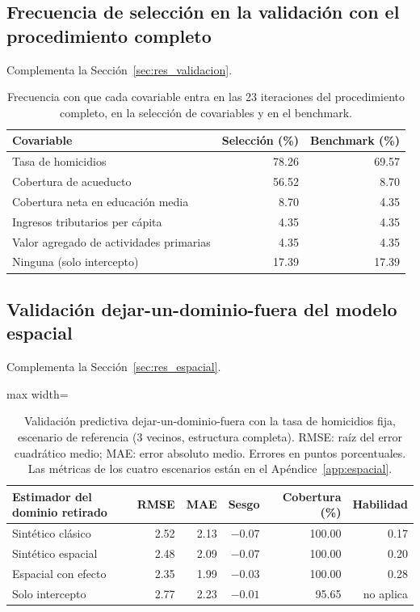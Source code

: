 \subsection{Frecuencia de selección en la validación con el procedimiento completo}

Complementa la Sección~\ref{sec:res_validacion}.

\begin{table}[!htbp]
\centering
\small
\caption{Frecuencia con que cada covariable entra en las 23 iteraciones del procedimiento completo, en la selección de covariables y en el benchmark.}
\label{tab:res_frecuencia}
\begin{tabular}{l r r}
\toprule
Covariable & Selección (\%) & Benchmark (\%) \\
\midrule
Tasa de homicidios & 78.26 & 69.57 \\
Cobertura de acueducto & 56.52 & 8.70 \\
Cobertura neta en educación media & 8.70 & 4.35 \\
Ingresos tributarios per cápita & 4.35 & 4.35 \\
Valor agregado de actividades primarias & 4.35 & 4.35 \\
Ninguna (solo intercepto) & 17.39 & 17.39 \\
\bottomrule
\end{tabular}
\end{table}

\subsection{Validación dejar-un-dominio-fuera del modelo espacial}

Complementa la Sección~\ref{sec:res_espacial}.

\begin{table}[!htbp]
\centering
\small
\caption[Validación del escenario espacial de referencia]{Validación predictiva dejar-un-dominio-fuera con la tasa de homicidios fija, escenario de referencia (3 vecinos, estructura completa). RMSE: raíz del error cuadrático medio; MAE: error absoluto medio. Errores en puntos porcentuales. Las métricas de los cuatro escenarios están en el Apéndice~\ref{app:espacial}.}
\label{tab:res_validacion_espacial}
\begin{adjustbox}{max width=\linewidth}
\begin{tabular}{l r r r r r}
\toprule
Estimador del dominio retirado & RMSE & MAE & Sesgo & Cobertura (\%) & Habilidad \\
\midrule
Sintético clásico & 2.52 & 2.13 & $-0.07$ & 100.00 & 0.17 \\
Sintético espacial & 2.48 & 2.09 & $-0.07$ & 100.00 & 0.20 \\
Espacial con efecto & 2.35 & 1.99 & $-0.03$ & 100.00 & 0.28 \\
Solo intercepto & 2.77 & 2.23 & $-0.01$ & 95.65 & no aplica \\
\bottomrule
\end{tabular}
\end{adjustbox}
\end{table}

\FloatBarrier

